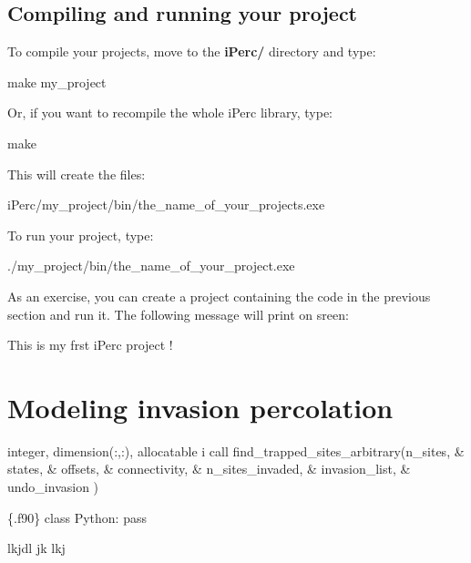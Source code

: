 \hypertarget{index_compile_project}{}\subsection{\-Compiling and running your project}\label{index_compile_project}
\-To compile your projects, move to the {\bfseries i\-Perc/} directory and type\-: 
\begin{DoxyCode}
 make my\_project 
\end{DoxyCode}
 \-Or, if you want to recompile the whole i\-Perc library, type\-: 
\begin{DoxyCode}
 make 
\end{DoxyCode}
 \-This will create the files\-: 
\begin{DoxyCode}
 iPerc/my\_project/bin/the\_name\_of\_your\_projects.exe 
\end{DoxyCode}
 \-To run your project, type\-: 
\begin{DoxyCode}
 ./my\_project/bin/the\_name\_of\_your\_project.exe 
\end{DoxyCode}
 \-As an exercise, you can create a project containing the code in the previous section and run it. \-The following message will print on sreen\-: 
\begin{DoxyCode}
 This is my frst iPerc project ! 
\end{DoxyCode}
 \hypertarget{index_modeling_sec}{}\section{\-Modeling invasion percolation}\label{index_modeling_sec}

\begin{DoxyCode}
 \textcolor{keywordtype}{integer}, \textcolor{keywordtype}{dimension(:,:)}, \textcolor{keywordtype}{allocatable} i
 call find\_trapped\_sites\_arbitrary(n\_sites,           &
                                   states,            &
                                   offsets,           &
                                   connectivity,      &
                                   n\_sites\_invaded,   &
                                   invasion\_list,     &
                                   undo\_invasion      )
\end{DoxyCode}
 
\begin{DoxyCode}
 \{.f90\}
  class Python:
     pass
\end{DoxyCode}


lkjdl jk lkj 